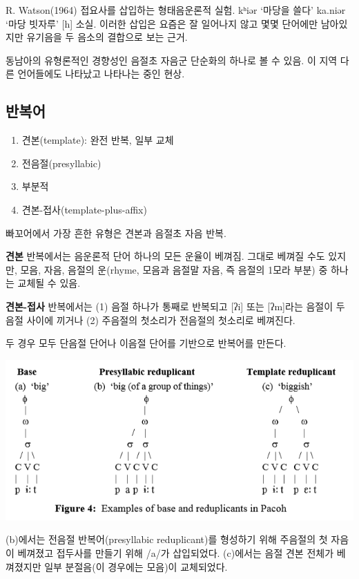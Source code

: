 R. Watson(1964) 접요사를 삽입하는 형태음운론적 실험.
kʰiər `마당을 쓸다' ka.niər `마당 빗자루' [h] 소실. 이러한 삽입은 요즘은 잘 일어나지 않고 몇몇 단어에만 남아있지만 유기음을 두 음소의 결합으로 보는 근거.

동남아의 유형론적인 경향성인 음절초 자음군 단순화의 하나로 볼 수 있음. 이 지역 다른 언어들에도 나타났고 나타나는 중인 현상.

\subsection{반복어}
\begin{enumerate}
\item 견본(template): 완전 반복, 일부 교체
\item 전음절(presyllabic)
\item 부분적
\item 견본-접사(template-plus-affix)
\end{enumerate}

빠꼬어에서 가장 흔한 유형은 견본과 음절초 자음 반복.

\textbf{견본} 반복에서는 음운론적 단어 하나의 모든 운율이 베껴짐. 그대로 베껴질 수도 있지만, 모음, 자음, 음절의 운(rhyme, 모음과 음절말 자음, 즉 음절의 1모라 부분) 중 하나는 교체될 수 있음.

\textbf{견본-접사} 반복에서는 (1) 음절 하나가 통째로 반복되고 [ʔi] 또는 [ʔm]라는 음절이 두 음절 사이에 끼거나 (2) 주음절의 첫소리가 전음절의 첫소리로 베껴진다.

두 경우 모두 단음절 단어나 이음절 단어를 기반으로 반복어를 만든다.

\begin{center}
\includegraphics{Pacoh/src/PacohFigure4.png}
\end{center}

(b)에서는 전음절 반복어(presyllabic reduplicant)를 형성하기 위해 주음절의 첫 자음이 베껴졌고 접두사를 만들기 위해 /a/가 삽입되었다. (c)에서는 음절 견본 전체가 베껴졌지만 일부 분절음(이 경우에는 모음)이 교체되었다.

